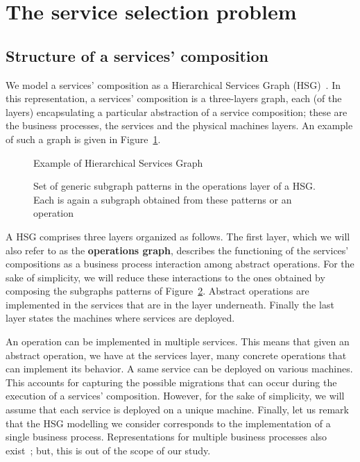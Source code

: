 \documentclass[a4paper]{article}
\begin{document}
\section{The service selection problem} \label{SSP}

\subsection{Structure of a services' composition}

We model a services' composition as a Hierarchical Services Graph (HSG)~\cite{GoldmanNgoko,mgc2012,JISA}. 
In this representation, a services' composition is a three-layers graph, each (of the layers) encapsulating a particular abstraction of a service 
composition; these are the business processes, the services and the physical machines layers. 
An example of such a graph is given in Figure~\ref{ExampleHSG}. 
\begin{figure}[htbp]
\centering
{}
\caption{Example of Hierarchical Services Graph}\label{ExampleHSG}
\end{figure}

\begin{figure}[htbp]
\centering
{}
\caption{Set of generic subgraph patterns in the operations layer of a HSG. Each  
is again a subgraph obtained from these patterns or an operation}\label{flows}
\end{figure}

A HSG comprises three layers organized as follows. The first layer, which we will also refer to as the \textbf{operations graph}, 
describes the functioning of the services' compositions as a business process interaction among abstract operations. 
For the sake of simplicity, we will reduce these interactions to the ones obtained by composing the subgraphs patterns of Figure~\ref{flows}. 
Abstract operations are implemented in the services that are in the layer underneath. Finally the last layer states the machines where 
services are deployed. 

An operation can be implemented in multiple services. This means that given an abstract operation, we have at the services 
layer, many concrete operations that can implement its behavior. A same service can be deployed on various machines. This accounts 
for capturing the possible migrations that can occur during the execution of a services' composition. However, for the sake of simplicity, 
we will assume that each service is deployed on a unique machine. 
Finally, let us remark that the HSG modelling we consider corresponds to the implementation of a single business process. 
Representations for multiple business processes also exist~\cite{mgc2012,JISA}; but, this is out of the scope of our 
study.
\end{document}

